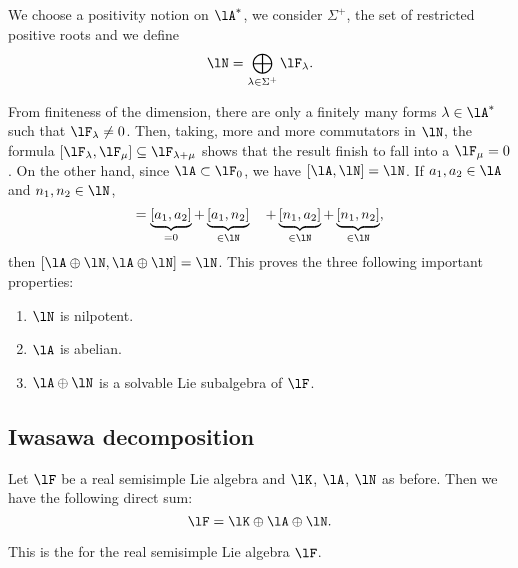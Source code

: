 We choose a positivity notion on $\lA^*$, we consider $\Sigma^+$, the set of restricted positive roots and we define
\[
  \lN=\bigoplus_{\lambda\in\Sigma^+}\lF_{\lambda}.
\]

From finiteness of the dimension, there are only a finitely many forms $\lambda\in\lA^*$ such that $\lF_{\lambda}\neq 0$. Then, taking, more and more commutators in $\lN$, the formula $[\lF_{\lambda},\lF_{\mu}]\subseteq\lF_{\lambda+\mu}$ shows that the result finish to fall into a $\lF_{\mu}=0$. On the other hand, since $\lA\subset\lF_0$, we have $[\lA,\lN]=\lN$. If $a_1,a_2\in\lA$ and $n_1,n_2\in\lN$,
\begin{equation}
   [a_1+n_1,a_2+n_2]=\underbrace{[a_1,a_2]}_{=0}+\underbrace{[a_1,n_2]}_{\in\lN}
                      \quad+\underbrace{[n_1,a_2]}_{\in\lN}+\underbrace{[n_1,n_2]}_{\in\lN},
\end{equation}
then $[\lA\oplus\lN,\lA\oplus\lN]=\lN$. This proves the three following important properties:

\begin{enumerate}
\item $\lN$ is nilpotent.
\item $\lA$ is abelian.
\item $\lA\oplus\lN$ is a solvable Lie subalgebra of $\lF$.
\end{enumerate}

\subsection{Iwasawa decomposition}

\begin{theorem}
Let $\lF$ be a real semisimple Lie algebra and $\lK$, $\lA$, $\lN$ as before. Then we have the following direct sum:
\begin{equation}
   \lF=\lK\oplus\lA\oplus\lN.
\end{equation}
\end{theorem}

This is the  for the real semisimple Lie algebra $\lF$.

